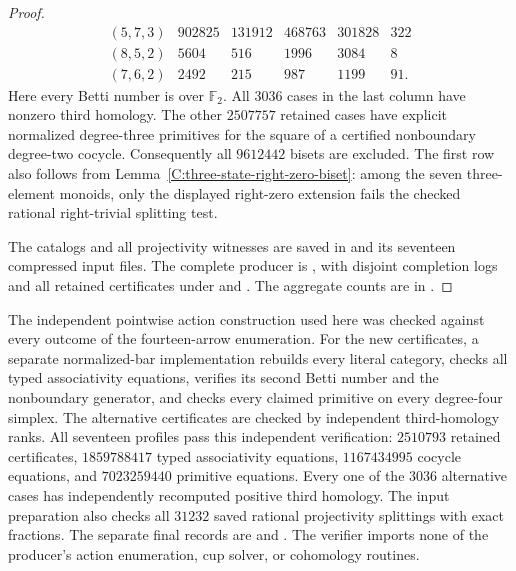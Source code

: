 \begin{proof}
\[\begin{array}{c|r|r|r|r|r}
(5,7,3)&902825&131912&468763&301828&322\\
(8,5,2)&5604&516&1996&3084&8\\
(7,6,2)&2492&215&987&1199&91.
\end{array}
\]
Here every Betti number is over $\mathbb F_2$.
All $3036$ cases in the last column have nonzero third homology.
The other $2507757$ retained cases have explicit normalized
degree-three primitives for the square of a certified nonboundary
degree-two cocycle.  Consequently all $9612442$ bisets are excluded.
The first row also follows from
Lemma~\ref{C:three-state-right-zero-biset}: among the seven
three-element monoids, only the displayed right-zero extension
fails the checked rational right-trivial splitting test.

The catalogs and all projectivity witnesses are saved in
 and its
seventeen compressed input files.  The complete producer is
, with disjoint completion logs
and all retained certificates under
 and
.
The aggregate counts are in
.
\end{proof}

\begin{remark}
\label{C:fifteen-triangular-verification}
The independent pointwise action construction used here was
checked against every outcome of the fourteen-arrow enumeration.
For the new certificates, a separate normalized-bar implementation
rebuilds every literal category, checks all typed associativity
equations, verifies its second Betti number and the nonboundary
generator, and checks every claimed primitive on every degree-four
simplex.  The alternative certificates are checked by independent
third-homology ranks.  All seventeen profiles pass this independent
verification: $2510793$ retained certificates, $1859788417$ typed
associativity equations, $1167434995$ cocycle equations, and
$7023259440$ primitive equations.  Every one of the $3036$
alternative cases has independently recomputed positive third
homology.  The input preparation also checks all $31232$ saved
rational projectivity splittings with exact fractions.  The
separate final records are
and
.
The verifier imports none of the producer's action enumeration,
cup solver, or cohomology routines.
\end{remark}

